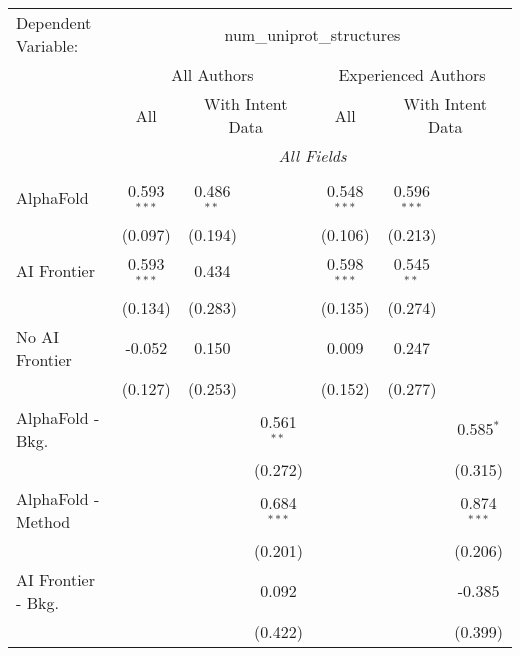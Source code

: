 \begingroup
\centering
\begin{tabular}{lcccccc}
   \tabularnewline \midrule \midrule
   Dependent Variable: & \multicolumn{6}{c}{num\_uniprot\_structures}\\
 & \multicolumn{3}{c}{All Authors} & \multicolumn{3}{c}{Experienced Authors} \\
\cmidrule(lr){2-4} \cmidrule(lr){5-7}
 & \multicolumn{1}{c}{All} & \multicolumn{2}{c}{With Intent Data} & \multicolumn{1}{c}{All} & \multicolumn{2}{c}{With Intent Data} \\
\cmidrule(lr){2-2} \cmidrule(lr){3-4} \cmidrule(lr){5-5} \cmidrule(lr){6-7}
 & \multicolumn{6}{c}{\textit{All Fields}} \\ \\
   AlphaFold               & 0.593$^{***}$ & 0.486$^{**}$ &               & 0.548$^{***}$ & 0.596$^{***}$ &   \\   
                           & (0.097)       & (0.194)      &               & (0.106)       & (0.213)       &   \\   
   AI Frontier             & 0.593$^{***}$ & 0.434        &               & 0.598$^{***}$ & 0.545$^{**}$  &   \\   
                           & (0.134)       & (0.283)      &               & (0.135)       & (0.274)       &   \\   
   No AI Frontier          & -0.052        & 0.150        &               & 0.009         & 0.247         &   \\   
                           & (0.127)       & (0.253)      &               & (0.152)       & (0.277)       &   \\   
   AlphaFold - Bkg.        &               &              & 0.561$^{**}$  &               &               & 0.585$^{*}$\\   
                           &               &              & (0.272)       &               &               & (0.315)\\   
   AlphaFold - Method      &               &              & 0.684$^{***}$ &               &               & 0.874$^{***}$\\   
                           &               &              & (0.201)       &               &               & (0.206)\\   
   AI Frontier - Bkg.      &               &              & 0.092         &               &               & -0.385\\   
                           &               &              & (0.422)       &               &               & (0.399)\\   

\end{tabular}
